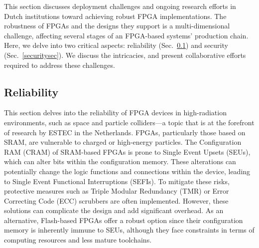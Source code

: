 This section discusses deployment challenges and ongoing research efforts in Dutch institutions toward achieving robust FPGA implementations. The robustness of FPGAs and the designs they support is a multi-dimensional challenge, affecting several stages of an FPGA-based systems' production chain. Here, we delve into two critical aspects: reliability (Sec.~\ref{reliabilitysec}) and security (Sec.~\ref{securitysec}). %
We discuss the intricacies, and present collaborative efforts required to address these challenges.

\subsection{Reliability}
\label{reliabilitysec}
This section delves into the reliability of FPGA devices %
in high-radiation environments, such as space and particle colliders---a topic that is at the forefront of research by ESTEC in the Netherlands.
%
%
FPGAs, particularly those based on SRAM, are vulnerable to charged or high-energy particles. The Configuration RAM (CRAM) of SRAM-based FPGAs is prone to Single Event Upsets (SEUs), which can alter bits within the configuration memory. These alterations can potentially change the logic functions and connections within the device, leading to Single Event Functional Interruptions (SEFIs). To mitigate these risks, protective measures such as Triple Modular Redundancy (TMR) or Error Correcting Code (ECC) scrubbers are often implemented. However, these solutions can complicate the design and add significant overhead. %
As an alternative, Flash-based FPGAs offer a robust option since their configuration memory is inherently immune to SEUs, although they face constraints in terms of computing resources and less mature toolchains. %

